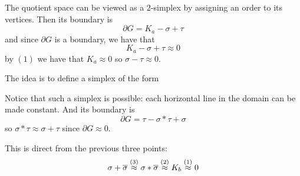         The quotient space can be viewed as a $2$-simplex by assigning an order to its vertices.
        Then its boundary is
        $$ \partial G = K_a - \sigma + \tau $$
        and since $\partial G$ is a boundary, we have that
        $$ K_a - \sigma + \tau \approx 0 $$
        by $(1)$ we have that $K_a\approx0$ so $\sigma-\tau\approx0$.

    \item The idea is to define a simplex of the form

        \centerline{\def\coordhbuf{0pt}\def\coordvbuf{-2.5pt}
        }

        Notice that such a simplex is possible: each horizontal line in the domain can be made constant.
        And its boundary is
        $$ \partial G = \tau - \sigma*\tau + \sigma $$
        so $\sigma*\tau\approx\sigma+\tau$ since $\partial G\approx0$.

    \item This is direct from the previous three points:
        $$ \sigma+\overline\sigma \buildrel(3)\over\approx \sigma*\overline\sigma \buildrel(2)\over\approx K_b \buildrel(1)\over\approx 0 $$
\eenum

